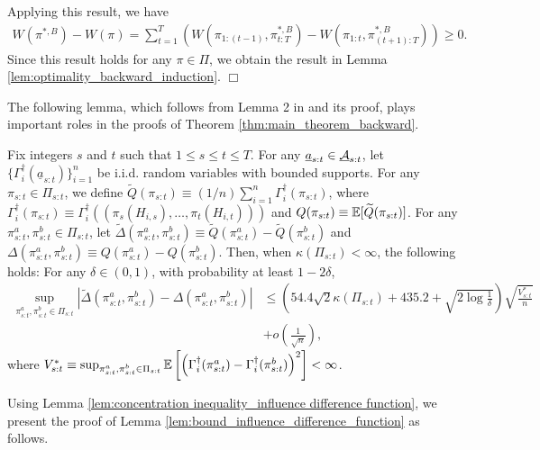 Applying this result, we have 
\begin{align*}
    W(\pi^{\ast,B}) - W(\pi) = \sum_{t=1}^{T}\left(W(\pi_{1:(t-1)},\pi_{t:T}^{\ast,B}) - W(\pi_{1:t},\pi_{(t+1):T}^{\ast,B})\right)
     \geq 0.
\end{align*} Since this result holds for any $\pi \in \Pi$, we obtain the result in Lemma \ref{lem:optimality_backward_induction}. \hfill {\large $\Box$}
\bigskip

The following lemma, which follows from Lemma 2 in \cite{zhou2022offline} and its proof, plays important roles in the proofs of Theorem 
\ref{thm:main_theorem_backward}.

\medskip{}

\begin{lemma} \label{lem:concentration inequality_influence difference function}
Fix integers $s$ and $t$ such that $1\leq s \leq t \leq T$. For any $\underline{a}_{s:t}\in \underline{\mathcal{A}}_{s:t}$, let $\{\Gamma_{i}^{\dag}(\underline{a}_{s:t})\}_{i=1}^{n}$ be i.i.d. random variables with bounded supports. 
For any $\pi_{s:t} \in \Pi_{s:t}$, we define $\widetilde{Q}(\pi_{s:t}) \equiv (1/n) \sum_{i=1}^{n}  \Gamma_{i}^{\dag}(\pi_{s:t})$, where $\Gamma_{i}^{\dag}(\pi_{s:t}) \equiv \Gamma_{i}^{\dag}((\pi_{s}(H_{i,s}),\ldots,\pi_{t}(H_{i,t})))$ and $Q(\pi_{s:t}) \equiv  \mathbb{E}[\widetilde{Q}(\pi_{s:t})]$. For any $\pi_{s:t}^{a},\pi_{s:t}^{b} \in \Pi_{s:t}$, let $\widetilde{\Delta}(\pi_{s:t}^{a},\pi_{s:t}^{b}) \equiv \widetilde{Q}(\pi_{s:t}^{a}) - \widetilde{Q}(\pi_{s:t}^{b})$ and $\Delta(\pi_{s:t}^{a},\pi_{s:t}^{b}) \equiv Q(\pi_{s:t}^{a}) - Q(\pi_{s:t}^{b})$. Then, when $\kappa(\Pi_{s:t}) < \infty$, the following holds: For any $\delta \in (0,1)$, with probability at least $1-2\delta$,
\begin{align*}
    \sup_{\pi_{s:t}^{a},\pi_{s:t}^{b} \in \Pi_{s:t}} \left|\widetilde{\Delta}(\pi_{s:t}^{a},\pi_{s:t}^{b})-\Delta(\pi_{s:t}^{a},\pi_{s:t}^{b})\right| &\leq \left(54.4 \sqrt{2}\kappa(\Pi_{s:t}) + 435.2 + \sqrt{2 \log \frac{1}{\delta}}\right)\sqrt{\frac{V_{s:t}^{\ast}}{n}} \\
    &+ o\left(\frac{1}{\sqrt{n}}\right),
\end{align*}
where 
    $V_{s:t}^{\ast}  \equiv  \sup_{\pi_{s:t}^{a},\pi_{s:t}^{b} \in \Pi_{s:t}}\mathbb{E}
    \left[\left(\Gamma_{i}^{\dag}(\pi_{s:t}^{a}) - \Gamma_{i}^{\dag}(\pi_{s:t}^{b}) \right)^2\right] < \infty$.
\end{lemma}

\medskip

Using Lemma \ref{lem:concentration inequality_influence difference function}, we present the proof of Lemma \ref{lem:bound_influence_difference_function} as follows.

